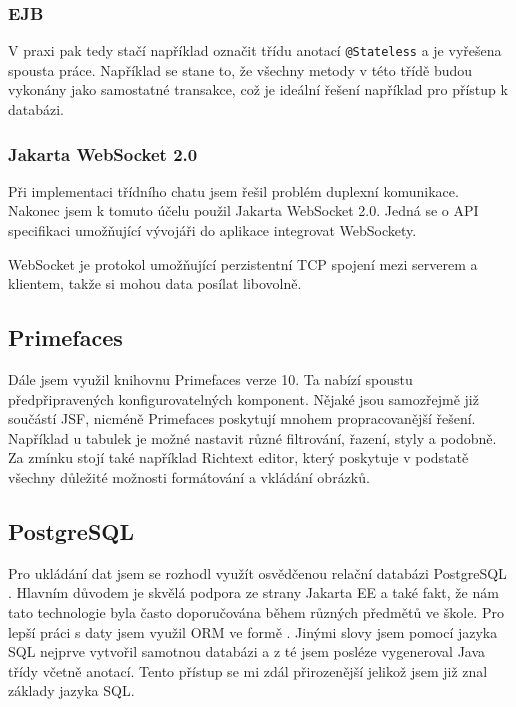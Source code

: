 \documentclass[twoside]{ctuthesis}
\theoremstyle{plain}
\theoremstyle{definition}
\theoremstyle{note}
\begin{document}
\subsubsection{EJB}

\textit{} \cite{goncalves_2013}

V praxi pak tedy stačí například označit třídu anotací \texttt{@Stateless} a je vyřešena spousta práce. Například se stane to, že všechny metody v této třídě budou vykonány jako samostatné transakce, což je ideální řešení například pro přístup k databázi.

\subsubsection{Jakarta WebSocket 2.0}
Při implementaci třídního chatu jsem řešil problém duplexní komunikace. Nakonec jsem k tomuto účelu použil Jakarta WebSocket 2.0. Jedná se o API specifikaci umožňující vývojáři do aplikace integrovat WebSockety. \cite{jakarta_websockets}


WebSocket je protokol umožňující perzistentní TCP spojení mezi serverem a klientem, takže si mohou data posílat libovolně. \cite{websockets}


\subsection{Primefaces}
Dále jsem využil knihovnu Primefaces verze 10. Ta nabízí spoustu předpřipravených konfigurovatelných komponent. Nějaké jsou samozřejmě již součástí JSF, nicméně Primefaces poskytují mnohem propracovanější řešení. Například u tabulek je možné nastavit různé filtrování, řazení, styly a podobně. Za zmínku stojí také například Richtext editor, který poskytuje v podstatě všechny důležité možnosti formátování a vkládání obrázků.

\subsection{PostgreSQL}
Pro ukládání dat jsem se rozhodl využít osvědčenou relační databázi PostgreSQL \cite{postgresql}. Hlavním důvodem je skvělá podpora ze strany Jakarta EE a také fakt, že nám tato technologie byla často doporučována během různých předmětů ve škole. Pro lepší práci s daty jsem využil ORM ve formě . Jinými slovy jsem pomocí jazyka SQL nejprve vytvořil samotnou databázi a z té jsem posléze vygeneroval Java třídy včetně anotací. Tento přístup se mi zdál přirozenější jelikož jsem již znal základy jazyka SQL.
\end{document}

